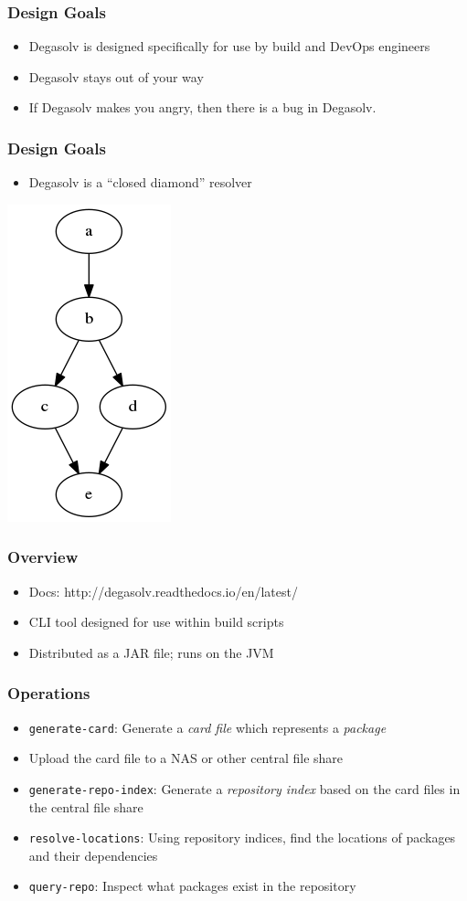 \documentclass{beamer}
\begin{document}
\begin{frame}
  \frametitle{Design Goals}
  \begin{itemize}
  \item Degasolv is designed specifically for use by build and DevOps engineers
  \item Degasolv stays out of your way
  \item If Degasolv makes you angry, then there is a bug in Degasolv.
  \end{itemize}
\end{frame}
\begin{frame}
    \frametitle{Design Goals}
    \begin{itemize}
  \item Degasolv is a ``closed diamond'' resolver
    \end{itemize}
  \centerline{\includegraphics[scale=0.5]{diamonddep.png}}
\end{frame}
\begin{frame}
  \frametitle{Overview}
  \begin{itemize}
  \item Docs: {\small http://degasolv.readthedocs.io/en/latest/}
  \item CLI tool designed for use within build scripts
  \item Distributed as a JAR file; runs on the JVM
  \end{itemize}
\end{frame}
\begin{frame}
  \frametitle{Operations}
  \begin{itemize}
      \item \texttt{generate-card}: Generate a \textit{card file} which
          represents a \textit{package}
  \item Upload the card file to a NAS or other central file share
  \item \texttt{generate-repo-index}: Generate a \textit{repository index}
    based on the card files in the central file share
  \item \texttt{resolve-locations}: Using repository indices, find the
      locations of packages and their dependencies
  \item \texttt{query-repo}: Inspect what packages exist in the repository
  \end{itemize}
\end{frame}
\end{document}
